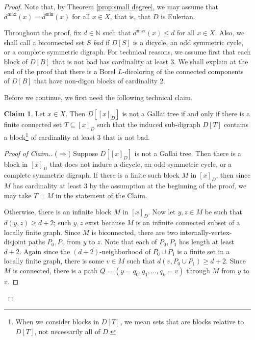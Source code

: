 \documentclass[psamsfonts]{amsart}
\theoremstyle{definition}
\newtheorem{claim}[thm]{Claim}
\newcommand{\N}{\mathbb N}
\theoremstyle{remark}
\numberwithin{equation}{section}
\begin{document}
\begin{proof}
    Note that, by Theorem \ref{prop:small degree}, we may assume that $d^{\max}(x) = d^{\min}(x)$ for all $x \in X$, that is, that $D$ is Eulerian.

    Throughout the proof, fix $d \in \N$ such that $d^{\max}(x) \leq d$ for all $x \in X$. Also, we shall call a biconnected set $S$ {\it bad} if $D[S]$ is a dicycle, an odd symmetric cycle, or a complete symmetric digraph. For technical reasons, we assume first that each block of $D[B]$ that is not bad has cardinality at least $3$. We shall explain at the end of the proof that there is a Borel $L$-dicoloring of the connected components of $D[B]$ that have non-digon blocks of cardinality $2$.

    Before we continue, we first need the following technical claim.

    \begin{claim}
        Let $x \in X$. Then $D[[x]_D]$ is not a Gallai tree if and only if there is a finite connected set $T \subseteq [x]_D$ such that the induced sub-digraph $D[T]$ contains a block\footnote{When we consider blocks in $D[T]$, we mean sets that are blocks relative to $D[T]$, not necessarily all of $D$.} of cardinality at least $3$ that is not bad.
    \end{claim}

    \begin{proof}[Proof of Claim.]
    ($\Rightarrow$) Suppose $D[[x]_D]$ is not a Gallai tree. Then there is a block in $[x]_D$ that does not induce a dicycle, an odd symmetric cycle, or a complete symmetric digraph. If there is a finite such block $M$ in $[x]_D$, then since $M$ has cardinality at least $3$ by the assumption at the beginning of the proof, we may take $T = M$ in the statement of the Claim.
    
    Otherwise, there is an infinite block $M$ in $[x]_D$. Now let $y, z \in M$ be such that $d(y, z) \geq d + 2$; such $y, z$ exist because $M$ is an infinite connected subset of a locally finite graph. Since $M$ is biconnected, there are two internally-vertex-disjoint paths $P_0, P_1$ from $y$ to $z$. Note that each of $P_0, P_1$ has length at least $d + 2$. Again since the $(d+ 2)$-neighborhood of $P_0 \cup P_1$ is a finite set in a locally finite graph, there is some $v \in M$ such that $d(v, P_0 \cup P_1) \geq d + 2$. Since $M$ is connected, there is a path $Q = (y = q_0, q_1, \dots, q_k = v)$ through $M$ from $y$ to $v$.


\end{proof}
\end{proof}
\end{document}
